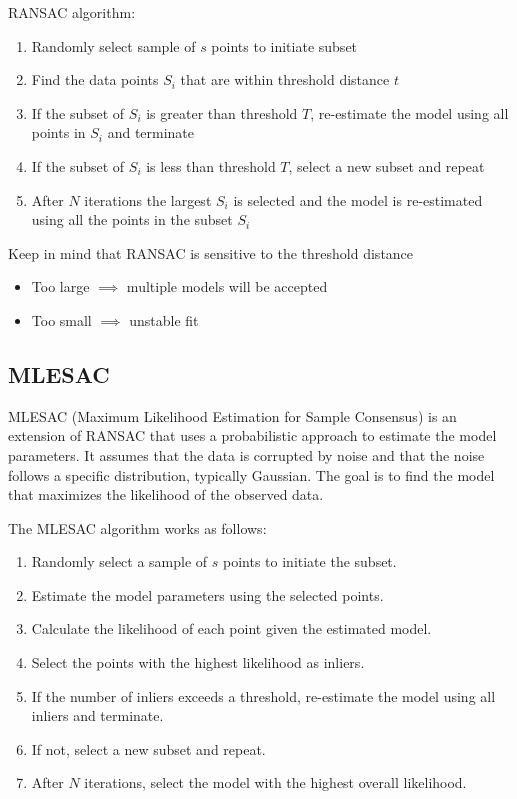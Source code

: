 \documentclass[12pt,a4paper]{article}
\begin{document}
RANSAC algorithm:
\begin{enumerate}
    \item Randomly select sample of $s$ points to initiate subset 
    \item Find the data points $S_i$ that are within threshold distance $t$
    \item If the subset of $S_i$ is greater than threshold $T$, re-estimate the model using all points in $S_i$ and terminate
    \item If the subset of $S_i$ is less than threshold $T$, select a new subset and repeat
    \item After $N$ iterations the largest $S_i$ is selected and the model is re-estimated using all the points in the subset $S_i$
\end{enumerate}

Keep in mind that RANSAC is sensitive to the threshold distance
\begin{itemize}
    \item Too large $\implies$ multiple models will be accepted
    \item Too small $\implies$ unstable fit
\end{itemize}

\subsection{MLESAC}
MLESAC (Maximum Likelihood Estimation for Sample Consensus) is an extension of RANSAC that uses a probabilistic approach to estimate the model parameters. It assumes that the data is corrupted by noise and that the noise follows a specific distribution, typically Gaussian. The goal is to find the model that maximizes the likelihood of the observed data.

The MLESAC algorithm works as follows:
\begin{enumerate}
    \item Randomly select a sample of $s$ points to initiate the subset.
    \item Estimate the model parameters using the selected points.
    \item Calculate the likelihood of each point given the estimated model.
    \item Select the points with the highest likelihood as inliers.
    \item If the number of inliers exceeds a threshold, re-estimate the model using all inliers and terminate.
    \item If not, select a new subset and repeat.
    \item After $N$ iterations, select the model with the highest overall likelihood.
\end{enumerate}
\end{document}
